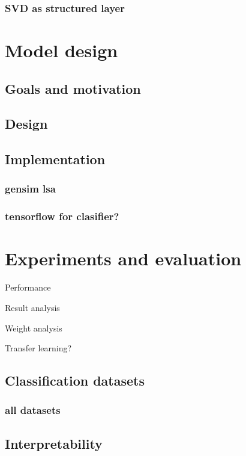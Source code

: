         \subsection{SVD as structured layer} 
            \cite{ionescu2015training} %

    
\chapter{Model design}
    \section{Goals and motivation}
    \section{Design}
    \section{Implementation}
        \subsection{gensim lsa}
        \subsection{tensorflow for clasifier?}
    \*
\chapter{Experiments and evaluation}

    Performance
    
    Result analysis
    
    Weight analysis
    
    Transfer learning?

    \section{Classification datasets}
        \subsection{all datasets}
            \cite{conneau2017supervised} %

    \section{Interpretability}
        \cite{ribeiro2016should} %


